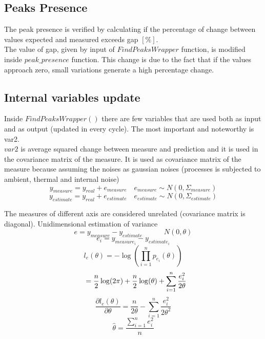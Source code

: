 \documentclass[journal]{IEEEtran}
\begin{document}
\subsection{Peaks Presence}
The peak presence is verified by calculating if the percentage of change between values expected and measured exceeds gap \([\%]\).
\\ The value of gap, given by input of \(FindPeaksWrapper\) function, is modified inside \(peak\_presence\) function. This change is due to the fact that if the values approach zero, small variations generate a high percentage change. 

\subsection{Internal variables update}
Inside \(FindPeaksWrapper()\) there are few variables that are used both as input and as output (updated in every cycle). The most important and noteworthy is var2.
\\\(var2\) is average squared change between measure and prediction and it is used in the covariance matrix of the measure.
It is used as covariance matrix of the measure because assuming the noises as gaussian noises (processes is subjected to ambient, thermal and internal noise)
\begin{displaymath}
    y_{measure} = y_{real} + e_{measure}  \quad  e_{measure}  \sim  N(0, \Sigma_{measure})
\end{displaymath}
\begin{displaymath}
    y_{estimate} = y_{real} + e_{estimate}  \quad  e_{estimate}  \sim  N(0, \Sigma_{estimate})
\end{displaymath}

The measures of different axis are considered unrelated (covariance matrix is diagonal).
Unidimensional estimation of variance
\begin{displaymath}
    e = y_{measure} - y_{estimate} \quad \quad \quad N(0, \theta)
\end{displaymath}
\begin{displaymath}
    e_{i} = y_{measure_{i}} - y_{estimate_{i}}
\end{displaymath}
\begin{displaymath}
    l_{e}(\theta) = -\log \left ( \prod_{i=1}^n p_{e_i}(\theta) \right ) 
\end{displaymath}
\begin{displaymath}
    \hspace{3mm} = \frac{n}{2}\log(2\pi) + \frac{n}{2}\log(\theta) + \sum_{i=1}^n \frac{e_i^2}{2\theta}
\end{displaymath}
\begin{displaymath}
    \frac{\partial l_{e}(\theta)}{\partial \theta} = \frac{n}{2\theta}- \sum_{i=1}^n \frac{e_i^2}{2\theta^2}
\end{displaymath}
\begin{displaymath}
    \hat\theta = \frac{\sum_{i=1}^n e_i^2}{n}
\end{displaymath}
\end{document}
